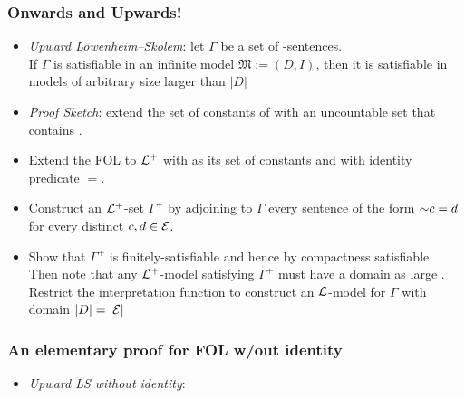 \begin{frame}
\frametitle{Onwards and Upwards!}

\begin{itemize}[<+->]

\item \emph{Upward L{\"o}wenheim--Skolem}:  let $\Gamma$ be a set of -sentences. \\ If $\Gamma$ is satisfiable in an infinite model $\mathfrak{M} := (D, I)$, then it is satisfiable in models of arbitrary size larger than $|D|$

\item \textit{Proof Sketch}: extend the set of constants  of  with an uncountable set  that contains . 
\item[] Extend the FOL  to $\mathcal{L}^+$ with  as its set of constants and with identity predicate $=$. 

\item Construct an $\mathcal{L}^+$-set $\Gamma^{+}$ by adjoining to $\Gamma$  every sentence of the form $\enot c = d$ for every distinct $c, d \in \mathcal{E}$.

\item Show that $\Gamma^{+}$ is finitely-satisfiable and hence by compactness satisfiable. Then note that any $\mathcal{L}^+$-model satisfying $\Gamma^{+}$ must have a domain as large . Restrict the interpretation function to construct an $\mathcal{L}$-model for $\Gamma$ with domain $|D| = |\mathcal{E}|$

\end{itemize}
\end{frame}


\iffalse 


\begin{frame}
\frametitle{An elementary proof for FOL w/out identity}

\begin{itemize}[<+->]

\item \emph{Upward LS without identity}:

\end{itemize}
\end{frame}

